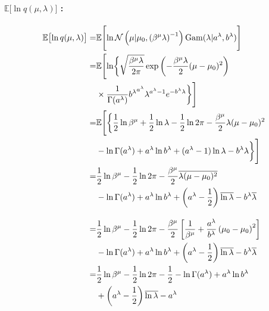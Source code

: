 \paragraph{$\mathbb{E}\bigl[\ln q( \mu, \lambda) \bigr]$ : }
\begin{align}
  \mathbb{E}\bigl[\ln q( \mu, \lambda) \bigr]  =&  
    \mathbb{E}\Biggl[ \ln \mathcal{N}\left(\mu | \mu_{0}, \left( \beta^\mu \lambda \right)^{-1}\right) {\rm Gam}(\lambda | a^\lambda, b^\lambda)  \Biggr]  \\
%
    =&  \mathbb{E}\Biggl[ \ln \biggl\{ 
      \sqrt{ \frac{ \beta^\mu \lambda }{ 2 \pi }} \exp\left( - \frac{\beta^\mu \lambda}{2} (\mu - \mu_{0})^2 \right)  \notag  \\  
    &  \times  \frac{ 1 }{ \Gamma(a^\lambda) } {b^\lambda}^{a^\lambda} {\lambda}^{a^\lambda - 1} e^{-b^\lambda \lambda}  \biggr\}  \Biggr]  \\
%
  =&  \mathbb{E}\Biggl[ \biggl\{  
      \frac{1}{2} \ln \beta^\mu + \frac{1}{2} \ln \lambda - \frac{1}{2} \ln 2 \pi - \frac{\beta^\mu}{2} \lambda (\mu - \mu_{0})^2  \notag  \\
      &  - \ln \Gamma(a^\lambda) + a^\lambda \ln b^\lambda + (a^\lambda - 1) \ln \lambda - b^\lambda \lambda  \biggr\} \Biggr]  \\
%
  =&  \frac{1}{2} \ln \beta^\mu - \frac{1}{2} \ln 2 \pi - \frac{\beta^\mu}{2} \overline{\lambda (\mu - \mu_{0})^2}  \notag  \\  
    &  - \ln \Gamma(a^\lambda) + a^\lambda \ln b^\lambda + \left( a^\lambda - \frac{1}{2} \right) \overline{\ln \lambda} - b^\lambda \overline{\lambda}  \\
%
\intertext{}
%
  =&  \frac{1}{2} \ln \beta^\mu - \frac{1}{2} \ln 2 \pi - \frac{\beta^\mu}{2} \left[ \frac{1}{\beta^\mu} + \frac{a^\lambda}{b^\lambda} \left( \mu_{0} - \mu_{0} \right)^2 \right]  \notag  \\
      &  - \ln \Gamma(a^\lambda) + a^\lambda \ln b^\lambda + \left( a^\lambda - \frac{1}{2} \right) \overline{\ln \lambda} - b^\lambda \overline{\lambda}  \\
%
  =&  \frac{1}{2} \ln \beta^\mu - \frac{1}{2} \ln 2 \pi - \frac{1}{2}  
        - \ln \Gamma(a^\lambda) + a^\lambda \ln b^\lambda  \notag  \\  
    &  + \left( a^\lambda - \frac{1}{2} \right) \overline{\ln \lambda} - a^\lambda  
\end{align}

%
